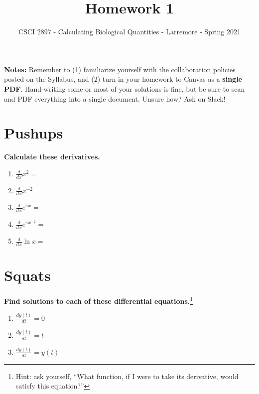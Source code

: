 \documentclass[11pt,onecolumn,superscriptaddress,notitlepage]{article}
\date{}
\newcommand{\dx}[0]{\displaystyle\frac{d}{dx}}
\begin{document}
\author{CSCI 2897 - Calculating Biological Quantities - Larremore - Spring 2021}
\title{Homework 1}
\maketitle

{\bf Notes:} Remember to (1) familiarize yourself with the collaboration policies posted on the Syllabus, and (2) turn in your homework to Canvas as a {\bf single PDF}. Hand-writing some or most of your solutions is fine, but be sure to scan and PDF everything into a single document. Unsure how? Ask on Slack! 

\section*{Pushups}

{\bf Calculate these derivatives.}

\begin{enumerate}
	\item $\dx x^2 = $
	\item $\dx x^{-2} = $
	\item $\dx e^{\pi x} = $
	\item $\dx e^{\pi x^{-2}} = $
	\item $\dx \ln{x} = $
\end{enumerate}

\section*{Squats}

{\bf Find solutions to each of these differential equations.}\footnote{Hint: ask yourself, ``What function, if I were to take its derivative, would satisfy this equation?''}

\begin{enumerate}[resume]
	\item $\displaystyle\frac{dy(t)}{dt} = 0$
	\item $\displaystyle\frac{dy(t)}{dt} = t$
	\item $\displaystyle\frac{dy(t)}{dt} = y(t)$
\end{enumerate}
\end{document}
